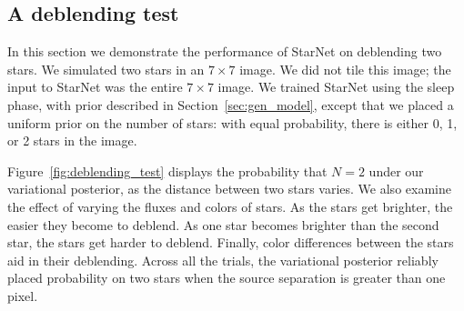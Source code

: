 \subsection{A deblending test}
\label{sec:deblending_test}

In this section we demonstrate the performance of StarNet on deblending two stars. We simulated two stars in an $7\times 7$ image. 
We did not tile this image; the input to StarNet was the entire $7\times 7$ image.
We trained StarNet using the sleep phase, with prior described in Section~\ref{sec:gen_model}, except that we placed a uniform prior on the number of stars: with equal probability, there is either 0, 1, or 2 stars in the image. 

Figure~\ref{fig:deblending_test} displays the probability that $N = 2$ under our variational posterior, as the distance between two stars varies.
We also examine the effect of varying the fluxes and colors of stars. 
As the stars get brighter, the easier they become to deblend. As one star becomes brighter than the second star, the stars get harder to deblend. Finally, color differences between the stars aid in their deblending.
Across all the trials, the variational posterior reliably placed probability on two stars when the source separation is greater than one pixel. 

